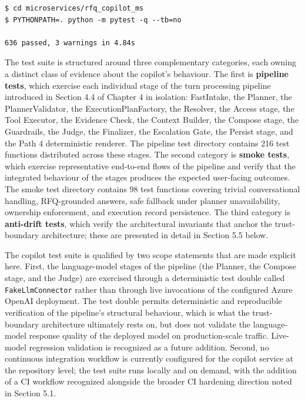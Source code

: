 \begin{lstlisting}[caption={Copilot service pytest invocation and outcome.}, label={lst:copilot_tests}, basicstyle=\ttfamily\small, frame=single, breaklines=true]
$ cd microservices/rfq_copilot_ms
$ PYTHONPATH=. python -m pytest -q --tb=no

636 passed, 3 warnings in 4.84s
\end{lstlisting}

The test suite is structured around three complementary categories, each owning a distinct class of evidence about the copilot's behaviour. The first is \textbf{pipeline tests}, which exercise each individual stage of the turn processing pipeline introduced in Section 4.4 of Chapter 4 in isolation: FastIntake, the Planner, the PlannerValidator, the ExecutionPlanFactory, the Resolver, the Access stage, the Tool Executor, the Evidence Check, the Context Builder, the Compose stage, the Guardrails, the Judge, the Finalizer, the Escalation Gate, the Persist stage, and the Path 4 deterministic renderer. The pipeline test directory contains 216 test functions distributed across these stages. The second category is \textbf{smoke tests}, which exercise representative end-to-end flows of the pipeline and verify that the integrated behaviour of the stages produces the expected user-facing outcomes. The smoke test directory contains 98 test functions covering trivial conversational handling, RFQ-grounded answers, safe fallback under planner unavailability, ownership enforcement, and execution record persistence. The third category is \textbf{anti-drift tests}, which verify the architectural invariants that anchor the trust-boundary architecture; these are presented in detail in Section 5.5 below.

The copilot test suite is qualified by two scope statements that are made explicit here. First, the language-model stages of the pipeline (the Planner, the Compose stage, and the Judge) are exercised through a deterministic test double called \texttt{FakeLlmConnector} rather than through live invocations of the configured Azure OpenAI deployment. The test double permits deterministic and reproducible verification of the pipeline's structural behaviour, which is what the trust-boundary architecture ultimately rests on, but does not validate the language-model response quality of the deployed model on production-scale traffic. Live-model regression validation is recognized as a future addition. Second, no continuous integration workflow is currently configured for the copilot service at the repository level; the test suite runs locally and on demand, with the addition of a CI workflow recognized alongside the broader CI hardening direction noted in Section 5.1.

